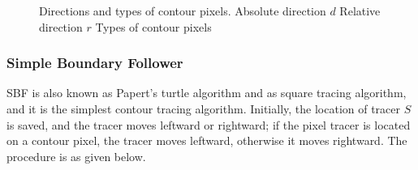 \begin{figure}[htbp]
	\centering
	 
	\caption{Directions and types of contour pixels. \protect{} Absolute direction $d$ \protect{} Relative direction $r$ \protect{} Types of contour pixels}
	\label{fig:image2}
\end{figure}


\subsubsection{Simple Boundary Follower}

SBF is also known as Papert's turtle algorithm \cite{Das1990Bivariate} and as square tracing algorithm\cite{Toussaint????Grids}, and it is the simplest contour tracing algorithm. Initially, the location of tracer $S$ is saved, and the tracer moves leftward or rightward; if the pixel tracer is located on a contour pixel, the tracer moves leftward, otherwise it moves rightward. The procedure is as given below.

